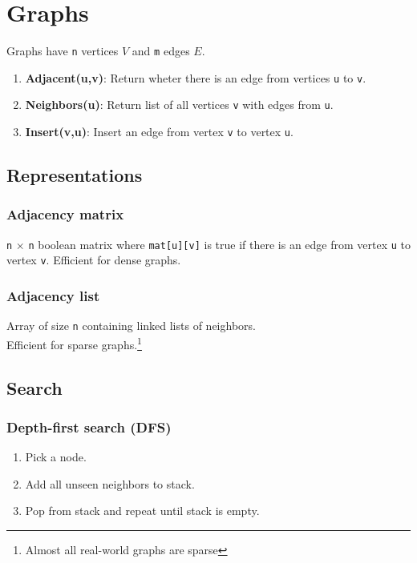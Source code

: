 \section{Graphs}

Graphs have \verb|n| vertices $V$ and \verb|m| edges $E$.

\begin{enumerate}
    \item \textbf{Adjacent(u,v)}: Return wheter there is an edge from vertices \verb|u| to \verb|v|.
    \item \textbf{Neighbors(u)}: Return list of all vertices \verb|v| with edges from \verb|u|.
    \item \textbf{Insert(v,u)}: Insert an edge from vertex \verb|v| to vertex \verb|u|.
\end{enumerate}

\subsection{Representations}
\label{sec:graph-representations}
\subsubsection{Adjacency matrix}
\verb|n| $\times$ \verb|n| boolean matrix where \verb|mat[u][v]| is true if there is an edge from vertex \verb|u| to vertex \verb|v|. Efficient for dense graphs.


\subsubsection{Adjacency list}
Array of size \verb|n| containing linked lists of neighbors. \\
Efficient for sparse graphs.\footnote{Almost all real-world graphs are sparse}


\subsection{Search}
\subsubsection{Depth-first search (DFS)}
\begin{enumerate}
    \item Pick a node.
    \item Add all unseen neighbors to stack.
    \item Pop from stack and repeat until stack is empty.
\end{enumerate}

